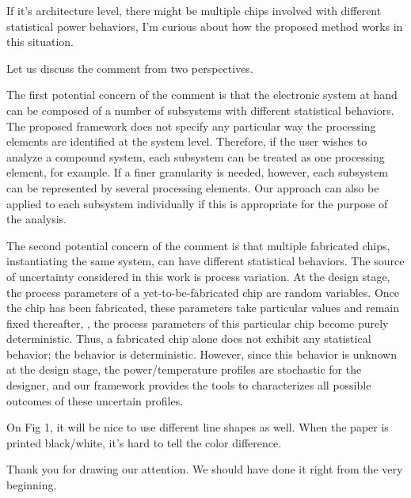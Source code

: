 \begin{reviewer}
If it’s architecture level, there might be multiple chips involved with different statistical power behaviors, I’m curious about how the proposed method works in this situation.
\end{reviewer}
\begin{authors}
Let us discuss the comment from two perspectives.

The first potential concern of the comment is that the electronic system at hand can be composed of a number of subsystems with different statistical behaviors.
The proposed framework does not specify any particular way the processing elements are identified at the system level.
Therefore, if the user wishes to analyze a compound system, each subsystem can be treated as one processing element, for example.
If a finer granularity is needed, however, each subsystem can be represented by several processing elements.
Our approach can also be applied to each subsystem individually if this is appropriate for the purpose of the analysis.

The second potential concern of the comment is that multiple fabricated chips, instantiating the same system, can have different statistical behaviors.
The source of uncertainty considered in this work is process variation.
At the design stage, the process parameters of a yet-to-be-fabricated chip are random variables.
Once the chip has been fabricated, these parameters take particular values and remain fixed thereafter, \ie, the process parameters of this particular chip become purely deterministic.
Thus, a fabricated chip alone does not exhibit any statistical behavior; the behavior is deterministic.
However, since this behavior is unknown at the design stage, the power/temperature profiles are stochastic for the designer, and our framework provides the tools to characterizes all possible outcomes of these uncertain profiles.

\begin{actions}
\end{actions}
\end{authors}

\begin{reviewer}
On Fig 1, it will be nice to use different line shapes as well. When the paper is printed black/white, it’s hard to tell the color difference.
\end{reviewer}
\begin{authors}
Thank you for drawing our attention.
We should have done it right from the very beginning.

\begin{actions}
\end{actions}
\end{authors}
